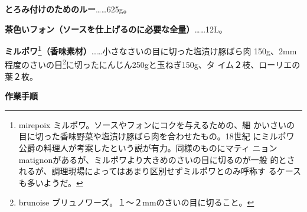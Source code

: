 \documentclass[twoside,12Q,b5paper]{escoffierltjsbook}
\begin{document}
\textbf{とろみ付けのためのルー}\ldots{}\ldots{}625g。

\textbf{茶色いフォン（ソースを仕上げるのに必要な全量）}\ldots{}\ldots{}12L。

\textbf{ミルポワ\footnote{mirepoix
  ミルポワ。ソースやフォンにコクを与えるための、細
  かいさいの目に切った香味野菜や塩漬け豚ばら肉を合わせたもの。18世紀
  にミルポワ公爵の料理人が考案したという説が有力。同様のものにマティ
  ニョンmatignonがあるが、ミルポワより大きめのさいの目に切るのが一般
  的とされるが、調理現場によってはあまり区別せずミルポワとのみ呼称す
  るケースも多いようだ。}（香味素材）}\ldots{}\ldots{}小さなさいの目に切った塩漬け豚ばら肉
150g、2mm程度のさいの目\footnote{brunoise
  ブリュノワーズ。１〜２mmのさいの目に切ること。}に切ったにんじん250gと玉ねぎ150g、タ
イム２枝、ローリエの葉２枚。

\textbf{作業手順}
\end{document}
